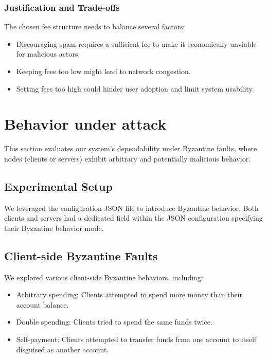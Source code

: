 \subsubsection*{Justification and Trade-offs} 
The chosen fee structure needs to balance several factors:

\begin{itemize}
    \item Discouraging spam requires a sufficient fee to make it economically unviable for malicious actors.
    \item Keeping fees too low might lead to network congestion.
    \item Setting fees too high could hinder user adoption and limit system usability.
\end{itemize}

\section{Behavior under attack}

This section evaluates our system's dependability under Byzantine faults, where nodes (clients or servers) exhibit arbitrary and potentially malicious behavior.

\subsection{Experimental Setup}

We leveraged the configuration JSON file to introduce Byzantine behavior. Both clients and servers had a dedicated field within the JSON configuration specifying their Byzantine behavior mode.

\subsection{Client-side Byzantine Faults} We explored various client-side Byzantine behaviors, including:
    \begin{itemize}
        \item Arbitrary spending: Clients attempted to spend more money than their account balance.
        \item Double spending: Clients tried to spend the same funds twice.
        \item Self-payment: Clients attempted to transfer funds from one account to itself disguised as another account.
    \end{itemize}

